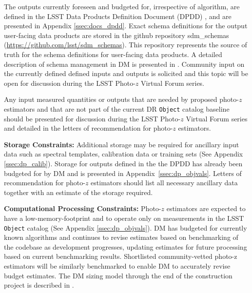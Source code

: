 \documentclass[DM,lsstdraft,toc]{lsstdoc}
\begin{document}
The outputs currently foreseen and budgeted for, irrespective of algorithm, are defined in the LSST Data Products Definition Document (DPDD) \cite{LSE-163}, and are presented in Appendix \ref{ssec:docs_dpdd}. 
Exact schema definitions for the output user-facing data products are stored in the github repository sdm\_schemas (\url{https://github.com/lsst/sdm\_schemas}). 
This repository represents the source of truth for the schema definitions for user-facing data products.
A detailed description of schema management in DM is presented in \cite{dmtn-153}. 
Community input on the currently defined defined inputs and outputs is solicited and this topic will be open for discussion during the LSST Photo-$z$ Virtual Forum series. 

Any input measured quantities or outputs that are needed by proposed photo-$z$ estimators and that are not part of the current DR {\tt Object} catalog baseline should be presented for discussion during the LSST Photo-$z$ Virtual Forum series and detailed in the letters of recommendation for photo-$z$ estimators. 

\textbf{Storage Constraints:}
Additional storage may be required for ancillary input data such as spectral templates, calibration data or training sets (See Appendix \ref{ssec:dp_calib}). 
Storage for outputs defined in the the DPDD \cite{LSE-163} has already been budgeted for by DM and is presented in Appendix~\ref{ssec:dp_objvals}. 
Letters of recommendation for photo-$z$ estimators should list all necessary ancillary data together with an estimate of the storage required.

\textbf{Computational Processing Constraints:}
Photo-$z$ estimators are expected to have a low-memory-footprint and to operate only on measurements in the LSST {\tt Object} catalog (See Appendix \ref{ssec:dp_objvals}). 
DM has budgeted for currently known algorithms and continues to revise estimates based on benchmarking of the codebase as development progresses, updating estimates for future processing based on current benchmarking results.  
Shortlisted community-vetted photo-z estimators will be similarly benchmarked to enable DM to accurately revise budget estimates. 
The DM sizing model through the end of the construction project is described in \cite{dmtn-135}.
\end{document}
